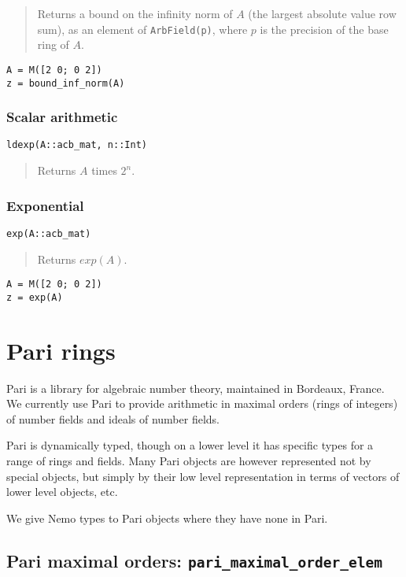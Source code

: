 \documentclass[a4paper,10pt]{article}
\newcommand{\code}{\lstinline}
\newcommand{\desc}[1]{\vspace{-3mm}\begin{quote}#1\end{quote}}
\begin{document}
{{\desc{Returns a bound on the infinity norm of $A$
(the largest absolute value row sum), as
an element of \code{ArbField(p)}, where $p$ is the precision of
the base ring of $A$.}

\begin{lstlisting}
A = M([2 0; 0 2])
z = bound_inf_norm(A)
\end{lstlisting}

\subsubsection{Scalar arithmetic}

\begin{lstlisting}
ldexp(A::acb_mat, n::Int)
\end{lstlisting}

\desc{Returns $A$ times $2^n$.}

\subsubsection{Exponential}

\begin{lstlisting}
exp(A::acb_mat)
\end{lstlisting}

\desc{Returns $exp(A)$.}

\begin{lstlisting}
A = M([2 0; 0 2])
z = exp(A)
\end{lstlisting}

\section{Pari rings}

Pari is a library for algebraic number theory, maintained in Bordeaux, France.
We currently use Pari to provide arithmetic in maximal orders (rings of integers)
of number fields and ideals of number fields.

Pari is dynamically typed, though on a lower level it has specific types for a
range of rings and fields. Many Pari objects are however represented not by
special objects, but simply by their low level representation in terms of vectors
of lower level objects, etc.

We give Nemo types to Pari objects where they have none in Pari.

\subsection{Pari maximal orders: \code|pari_maximal_order_elem|}

}}
\end{document}
